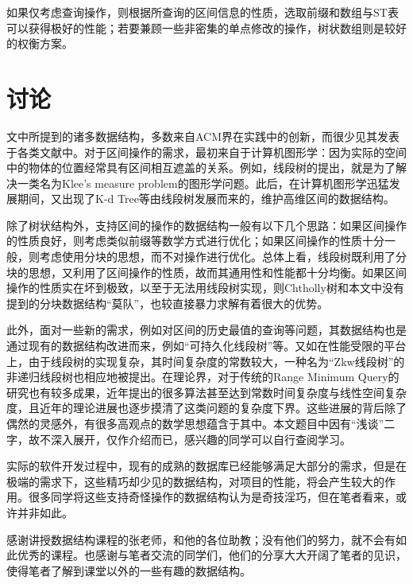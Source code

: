 \documentclass{cjc}
\begin{document}
如果仅考虑查询操作，则根据所查询的区间信息的性质，选取前缀和数组与ST表可以获得极好的性能；若要兼顾一些非密集的单点修改的操作，树状数组则是较好的权衡方案。

\section{讨论}

文中所提到的诸多数据结构，多数来自ACM界在实践中的创新，而很少见其发表于各类文献中。对于区间操作的需求，最初来自于计算机图形学：因为实际的空间中的物体的位置经常具有区间相互遮盖的关系。例如，线段树的提出，就是为了解决一类名为Klee's measure problem的图形学问题。此后，在计算机图形学迅猛发展期间，又出现了K-d Tree等由线段树发展而来的，维护高维区间的数据结构。

除了树状结构外，支持区间的操作的数据结构一般有以下几个思路：如果区间操作的性质良好，则考虑类似前缀等数学方式进行优化；如果区间操作的性质十分一般，则考虑使用分块的思想，而不对操作进行优化。总体上看，线段树既利用了分块的思想，又利用了区间操作的性质，故而其通用性和性能都十分均衡。如果区间操作的性质实在坏到极致，以至于无法用线段树实现，则Chtholly树和本文中没有提到的分块数据结构“莫队”，也较直接暴力求解有着很大的优势。

此外，面对一些新的需求，例如对区间的历史最值的查询等问题，其数据结构也是通过现有的数据结构改进而来，例如“可持久化线段树”等。又如在性能受限的平台上，由于线段树的实现复杂，其时间复杂度的常数较大，一种名为“Zkw线段树”的非递归线段树也相应地被提出。在理论界，对于传统的Range Minimum Query的研究也有较多成果，近年提出的很多算法甚至达到常数时间复杂度与线性空间复杂度，且近年的理论进展也逐步摸清了这类问题的复杂度下界。这些进展的背后除了偶然的灵感外，有很多高观点的数学思想蕴含于其中。本文题目中因有“浅谈”二字，故不深入展开，仅作介绍而已，感兴趣的同学可以自行查阅学习。

实际的软件开发过程中，现有的成熟的数据库已经能够满足大部分的需求，但是在极端的需求下，这些精巧却少见的数据结构，对项目的性能，将会产生较大的作用。很多同学将这些支持奇怪操作的数据结构认为是奇技淫巧，但在笔者看来，或许并非如此。


\begin{acknowledgments}
  感谢讲授数据结构课程的张老师，和他的各位助教；没有他们的努力，就不会有如此优秀的课程。也感谢与笔者交流的同学们，他们的分享大大开阔了笔者的见识，使得笔者了解到课堂以外的一些有趣的数据结构。
\end{acknowledgments}


\nocite{*}



\end{document}

